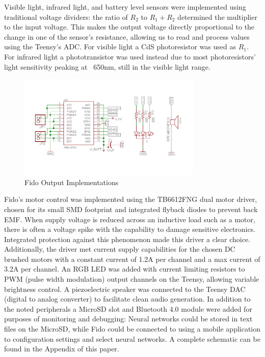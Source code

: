 Visible light, infrared light, and battery level sensors were implemented using traditional voltage dividers: the ratio of $R_2$ to $R_1 + R_2$ determined the multiplier to the input voltage.  This makes the output voltage directly proportional to the change in one of the sensor's resistance, allowing us to read and process values using the Teensy's ADC.  For visible light a CdS photoresistor was used as $R_1$.  For infrared light a phototransistor was used instead due to most photoresistors' light sensitivity peaking at ~650nm, still in the visible light range.

\begin{figure}[ht]
	\centering
	\includegraphics[height=5cm]{Figures/outDiagram.png}
	\caption{Fido Output Implementations}
\end{figure}

Fido's motor control was implemented using the TB6612FNG dual motor driver, chosen for its small SMD footprint and integrated flyback diodes to prevent back EMF.  When supply voltage is reduced across an inductive load such as a motor, there is often a voltage spike with the capability to damage sensitive electronics.  Integrated protection against this phenomenon made this driver a clear choice.  Additionally, the driver met current supply capabilities for the chosen DC brushed motors with a constant current of 1.2A per channel and a max current of 3.2A per channel.  An RGB LED was added with current limiting resistors to PWM (pulse width modulation) output channels on the Teensy, allowing variable brightness control.  A piezoelectric speaker was connected to the Teensy DAC (digital to analog converter) to facilitate clean audio generation.  In addition to the noted peripherals a MicroSD slot and Bluetooth 4.0 module were added for purposes of monitoring and debugging: Neural networks could be stored in text files on the MicroSD, while Fido could be connected to using a mobile application to configuration settings and select neural networks.  A complete schematic can be found in the Appendix of this paper.

